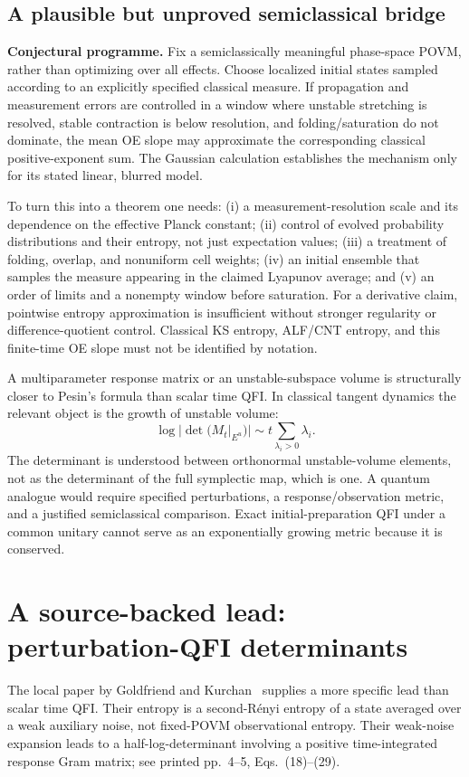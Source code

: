 \documentclass[11pt,a4paper]{article}
\begin{document}
\subsection{A plausible but unproved semiclassical bridge}
\textbf{Conjectural programme.} Fix a semiclassically meaningful phase-space POVM, rather than optimizing over all effects. Choose localized initial states sampled according to an explicitly specified classical measure. If propagation and measurement errors are controlled in a window where unstable stretching is resolved, stable contraction is below resolution, and folding/saturation do not dominate, the mean OE slope may approximate the corresponding classical positive-exponent sum. The Gaussian calculation establishes the mechanism only for its stated linear, blurred model.

To turn this into a theorem one needs: (i) a measurement-resolution scale and its dependence on the effective Planck constant; (ii) control of evolved probability distributions and their entropy, not just expectation values; (iii) a treatment of folding, overlap, and nonuniform cell weights; (iv) an initial ensemble that samples the measure appearing in the claimed Lyapunov average; and (v) an order of limits and a nonempty window before saturation. For a derivative claim, pointwise entropy approximation is insufficient without stronger regularity or difference-quotient control. Classical KS entropy, ALF/CNT entropy, and this finite-time OE slope must not be identified by notation.

A multiparameter response matrix or an unstable-subspace volume is structurally closer to Pesin's formula than scalar time QFI. In classical tangent dynamics the relevant object is the growth of unstable volume:
\[\log|\det(M_t|_{E^u})|\sim t\sum_{\lambda_i>0}\lambda_i.\]
The determinant is understood between orthonormal unstable-volume elements, not as the determinant of the full symplectic map, which is one. A quantum analogue would require specified perturbations, a response/observation metric, and a justified semiclassical comparison. Exact initial-preparation QFI under a common unitary cannot serve as an exponentially growing metric because it is conserved.

\section{A source-backed lead: perturbation-QFI determinants}
The local paper by Goldfriend and Kurchan~\cite{GK} supplies a more specific lead than scalar time QFI. Their entropy is a second-R\'enyi entropy of a state averaged over a weak auxiliary noise, not fixed-POVM observational entropy. Their weak-noise expansion leads to a half-log-determinant involving a positive time-integrated response Gram matrix; see printed pp.~4--5, Eqs.~(18)--(29).
\end{document}
